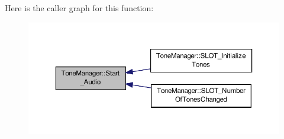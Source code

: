 Here is the caller graph for this function\-:
\nopagebreak
\begin{figure}[H]
\begin{center}
\leavevmode
\includegraphics[width=350pt]{class_tone_manager_a9c6253effbaab4dca2b087bc4ab88598_icgraph}
\end{center}
\end{figure}




